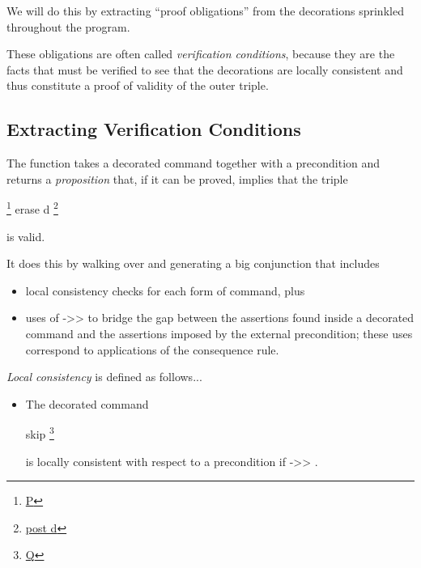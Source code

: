 \documentclass[12pt]{report}
\begin{document}
    We will do this by extracting ``proof obligations'' from the
    decorations sprinkled throughout the program.


    These obligations are often called \textit{verification conditions},
    because they are the facts that must be verified to see that the
    decorations are locally consistent and thus constitute a proof of
    validity of the outer triple. 
\begin{coqdoccode}
\coqdocemptyline
\end{coqdoccode}
\subsection{Extracting Verification Conditions}



 The function  takes a decorated command
     together with a precondition  and returns a \textit{proposition}
    that, if it can be proved, implies that the triple


     \footnote{\url{P}} erase d \footnote{\url{post d}}


    is valid.


    It does this by walking over  and generating a big conjunction
    that includes



\begin{itemize}
\item  local consistency checks for each form of command, plus



\item  uses of ->> to bridge the gap between the assertions found
      inside a decorated command and the assertions imposed by the
      external precondition; these uses correspond to applications
      of the consequence rule. 
\end{itemize}


 \textit{Local consistency} is defined as follows... 


\begin{itemize}
\item  The decorated command


        skip \footnote{\url{Q}}


      is locally consistent with respect to a precondition  if
       ->> .

\end{itemize}
\end{document}
